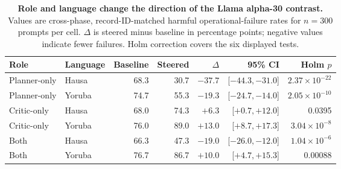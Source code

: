 \begin{table}[t]
\centering
\caption{\textbf{Role and language change the direction of the Llama alpha-30 contrast.} Values are cross-phase, record-ID-matched harmful operational-failure rates for $n=300$ prompts per cell. $\Delta$ is steered minus baseline in percentage points; negative values indicate fewer failures. Holm correction covers the six displayed tests.}
\label{tab:role_strength}
\small
\begin{tabular}{llrrrrr}
\toprule
Role & Language & Baseline & Steered & $\Delta$ & 95\% CI & Holm $p$\\
\midrule
Planner-only & Hausa & 68.3 & 30.7 & $-37.7$ & [$-44.3,-31.0$] & $2.37\times10^{-22}$\\
Planner-only & Yoruba & 74.7 & 55.3 & $-19.3$ & [$-24.7,-14.0$] & $2.05\times10^{-10}$\\
Critic-only & Hausa & 68.0 & 74.3 & $+6.3$ & [$+0.7,+12.0$] & 0.0395\\
Critic-only & Yoruba & 76.0 & 89.0 & $+13.0$ & [$+8.7,+17.3$] & $3.04\times10^{-8}$\\
Both & Hausa & 66.3 & 47.3 & $-19.0$ & [$-26.0,-12.0$] & $1.04\times10^{-6}$\\
Both & Yoruba & 76.7 & 86.7 & $+10.0$ & [$+4.7,+15.3$] & 0.00088\\
\bottomrule
\end{tabular}
\end{table}